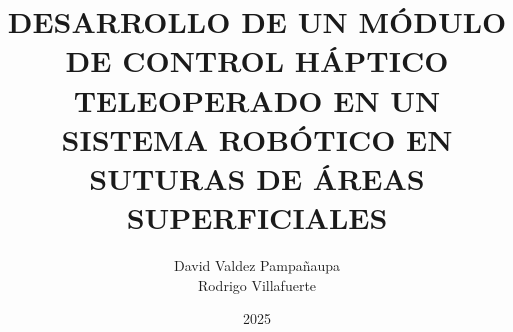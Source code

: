 \documentclass[a4paper,12pt,oneside]{tesisutec}
\begin{document}
\frontmatter


\title{DESARROLLO DE UN MÓDULO DE CONTROL HÁPTICO TELEOPERADO EN UN SISTEMA ROBÓTICO EN SUTURAS DE ÁREAS SUPERFICIALES}

\author{David Valdez Pampañaupa  \\ Rodrigo Villafuerte} %

\date{2025}

\maketitle






\tableofcontents

\newpage

\listoftables

\newpage

\listoffigures

\mainmatter
\pagestyle{fancy}


 



%




\renewcommand{\bibname}{\hfill\Large\bf{REFERENCIAS BIBLIOGRÁFICAS}\hfill}




\end{document}
